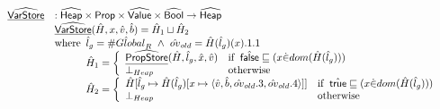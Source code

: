 \documentclass{article}
\newcommand{\SF}[1]{\mbox{\textsf{#1}}}
\newcommand{\wherec}[1]{{\rm where}\begin{array}[t]{l}#1\end{array}}
\newcommand{\ifc}[1]{{\rm if}\begin{array}[t]{l}#1\end{array}}
\newcommand{\owc}{{\rm otherwise}}
\newcommand{\Prop}{\SF{Prop}}
\newcommand{\abs}[1]{\widehat{\SF{#1}}}
\newcommand{\aHeap}{\abs{Heap}}
\newcommand{\aValue}{\abs{Value}}
\newcommand{\set}[1]{\left\{\begin{array}{l}#1\end{array}\right\}}
\newcommand{\ahf}[1]{\widehat{\underline{\sf #1}}}
\newcommand{\avarloc}[1]{\hat{\##1}}
\newcommand{\rwith}{~{\sf with}~}
\newcommand{\atrue}{\hat{\SF{true}}}
\newcommand{\afalse}{\hat{\SF{false}}}
\begin{document}
\[\begin{array}{ll}
\ahf{VarStore} & : \aHeap \times \Prop \times \aValue
\times \abs{Bool} \rightarrow \aHeap \\
& \ahf{VarStore}(\hat{H}, x, \hat{v}, \hat{b})
  =
  \hat{H}_1 \sqcup \hat{H}_2 \\
&\wherec{
  \hat{l}_g = \avarloc{Global}_R\ \land\ \hat{ov}_{old} = \hat{H}(\hat{l}_g)(x).1.1\\
  \hat{H}_1 =
  \left\{
    \begin{array}{ll}
      \ahf{PropStore}(\hat{H},\hat{l}_g,\hat{x},\hat{v}) & \ifc{\afalse\sqsubseteq(x \dot{\in} dom(\hat{H}(\hat{l}_g)))} \\
      \bot_{Heap} & \owc \\
    \end{array}
   \right.\\ 
  \hat{H}_2 =
  \left\{
    \begin{array}{ll}
      \hat{H}[\hat{l}_g\mapsto \hat{H}(\hat{l}_g)[x \mapsto
        \langle \hat{v},\hat{b},\hat{ov}_{old}.3,\hat{ov}_{old}.4\rangle]]
        & \ifc{
          \atrue\sqsubseteq (x \dot{\in} dom(\hat{H}(\hat{l}_g)))\\
        } \\
        \bot_{Heap} & \owc \\
    \end{array}
  \right. \\
}\\
\\


\end{array}\]
\end{document}
